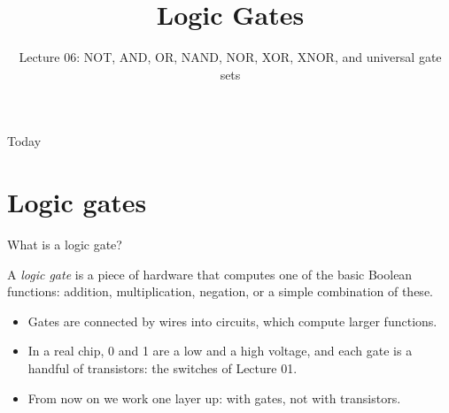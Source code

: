 \documentclass[10pt]{wosm-slides}
\title[Lecture 06 \textperiodcentered\ Logic Gates]{Logic Gates}
\subtitle{Lecture 06: NOT, AND, OR, NAND, NOR, XOR, XNOR, and universal gate sets}
\begin{document}
\maketitle

\begin{frame}{Today}
  \tableofcontents
\end{frame}

\section{Logic gates}

\begin{frame}{What is a logic gate?}
  \begin{definition}
    A \emph{logic gate} is a piece of hardware that computes one of the basic
    Boolean functions: addition, multiplication, negation, or a simple combination
    of these.
  \end{definition}

  \begin{itemize}
    \item Gates are connected by wires into \alert{circuits}, which compute larger
      functions.
    \item In a real chip, 0 and 1 are a low and a high voltage, and each gate is a
      handful of transistors: the switches of Lecture 01.
    \item From now on we work one layer up: with gates, not with transistors.
  \end{itemize}

  \medskip
\end{frame}
\end{document}
